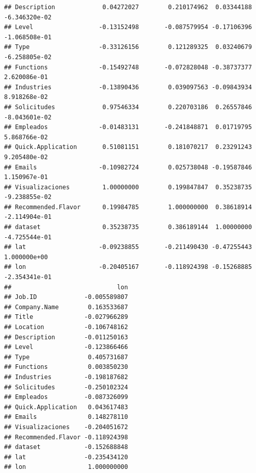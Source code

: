 \documentclass[
]{article}
\begin{document}
\begin{verbatim}
## Description             0.04272027        0.210174962  0.03344188 -6.346320e-02
## Level                  -0.13152498       -0.087579954 -0.17106396 -1.068508e-01
## Type                   -0.33126156        0.121289325  0.03240679 -6.258805e-02
## Functions              -0.15492748       -0.072828048 -0.38737377  2.620086e-01
## Industries             -0.13890436        0.039097563 -0.09843934  8.918268e-02
## Solicitudes             0.97546334        0.220703186  0.26557846 -8.043601e-02
## Empleados              -0.01483131       -0.241848871  0.01719795  5.868766e-02
## Quick.Application       0.51081151        0.181070217  0.23291243  9.205480e-02
## Emails                 -0.10982724        0.025738048 -0.19587846  1.150967e-01
## Visualizaciones         1.00000000        0.199847847  0.35238735 -9.238855e-02
## Recommended.Flavor      0.19984785        1.000000000  0.38618914 -2.114904e-01
## dataset                 0.35238735        0.386189144  1.00000000 -4.725544e-01
## lat                    -0.09238855       -0.211490430 -0.47255443  1.000000e+00
## lon                    -0.20405167       -0.118924398 -0.15268885 -2.354341e-01
##                             lon
## Job.ID             -0.005589807
## Company.Name        0.163533687
## Title              -0.027966289
## Location           -0.106748162
## Description        -0.011250163
## Level              -0.123866466
## Type                0.405731687
## Functions           0.003850230
## Industries         -0.198187682
## Solicitudes        -0.250102324
## Empleados          -0.087326099
## Quick.Application   0.043617483
## Emails              0.148278110
## Visualizaciones    -0.204051672
## Recommended.Flavor -0.118924398
## dataset            -0.152688848
## lat                -0.235434120
## lon                 1.000000000
\end{verbatim}
\end{document}
